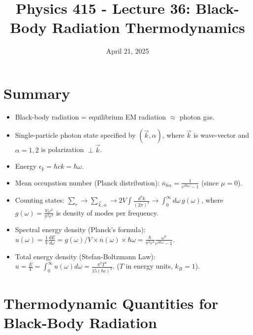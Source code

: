 \documentclass[11pt]{article}
\title{Physics 415 - Lecture 36: Black-Body Radiation Thermodynamics}
\date{April 21, 2025}
\author{} %
\newcommand{\eps}{\epsilon}
\newcommand{\nbar}{\overline{n}} %
\begin{document}
\maketitle
\thispagestyle{empty}

\section*{Summary}

\begin{itemize}
    \item Black-body radiation = equilibrium EM radiation $\approx$ photon gas.
    \item Single-particle photon state specified by $(\vec{k}, \alpha)$, where $\vec{k}$ is wave-vector and $\alpha=1, 2$ is polarization $\perp \vec{k}$.
    \item Energy $\eps_k = \hbar ck = \hbar\omega$.
    \item Mean occupation number (Planck distribution): $\nbar_{k\alpha} = \frac{1}{e^{\beta\hbar\omega}-1}$ (since $\mu=0$).
    \item Counting states: $\sum_r \to \sum_{\vec{k},\alpha} \to 2 V \int \frac{d^3k}{(2\pi)^3} \to \int_0^\infty d\omega \, g(\omega)$, where $g(\omega) = \frac{V\omega^2}{\pi^2 c^3}$ is density of modes per frequency.
    \item Spectral energy density (Planck's formula): $u(\omega) = \frac{1}{V}\frac{dE}{d\omega} = g(\omega)/V \times \nbar(\omega) \times \hbar\omega = \frac{\hbar}{\pi^2 c^3} \frac{\omega^3}{e^{\beta\hbar\omega}-1}$.
    \item Total energy density (Stefan-Boltzmann Law): $u = \frac{E}{V} = \int_0^\infty u(\omega) d\omega = \frac{\pi^2 T^4}{15 (\hbar c)^3}$. ($T$ in energy units, $k_B=1$).
\end{itemize}

\section*{Thermodynamic Quantities for Black-Body Radiation}
\end{document}
